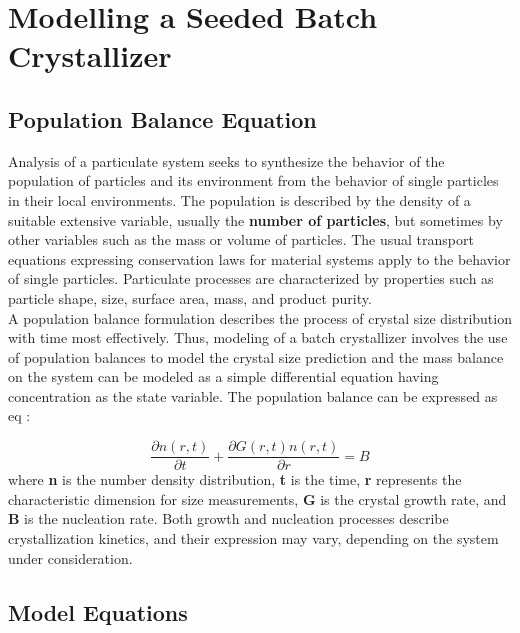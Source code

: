 
\chapter{Modelling a Seeded Batch Crystallizer}


\section{Population Balance Equation}

Analysis of a particulate system seeks to synthesize the behavior of the population of particles and its environment from the behavior of single particles in their local environments. The population is described by the density of a suitable extensive variable, usually the \textbf{number of particles}, but sometimes by other variables such as the mass or volume of particles. The usual transport equations expressing conservation laws for material systems apply to the behavior of single particles. Particulate processes are characterized by properties such as particle shape, size, surface area, mass, and product purity. \\
A population balance formulation describes the process of crystal size distribution with time most effectively. Thus, modeling of a batch crystallizer involves the use of population balances to model the crystal size prediction and the mass balance on the system can be modeled as a simple differential equation having concentration as the state variable.
The population balance can be expressed as eq :

\begin{equation} \label{populationbalance}
	\frac{\partial{n(r,t)}}{\partial{t}} + \frac{\partial{G(r,t)n(r,t)}}{\partial{r}} = B

\end{equation}
where \textbf{n} is the number density distribution, \textbf{t} is the time, \textbf{r} represents the characteristic dimension for size measurements, \textbf{G} is the crystal growth rate, and \textbf{B} is the nucleation rate. Both growth and nucleation processes describe crystallization kinetics, and their expression may vary, depending on the system under consideration.

\section{Model Equations} \label{modeleq}

